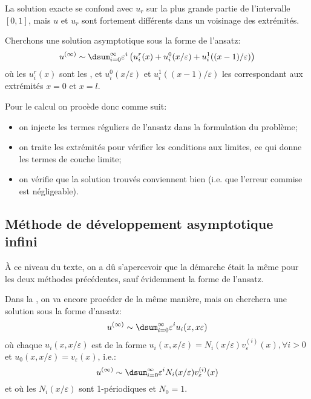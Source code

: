 La solution exacte se confond avec $u_r$ sur la plus grande partie de l'intervalle $[0,1]$,
mais $u$ et $u_r$ sont fortement différents dans un voisinage des extrémités.

\medskip
Cherchons une solution asymptotique sous la forme de l'ansatz:
\begin{equation}
u^{(\infty)} \sim \dsum_{i=0}^\infty \varepsilon^i\left( u_i^r(x) + u_i^0(x/\varepsilon)
+u_i^1((x-1)/\varepsilon) \right)
\end{equation}
où les $u_i^r(x)$ sont les , et $u_i^0(x/\varepsilon)$ et
$u_i^1((x-1)/\varepsilon)$ les  correspondant aux
extrémités $x=0$ et $x=l$.

\medskip
Pour le calcul on procède donc comme suit:
\begin{itemize}
   \item on injecte les termes réguliers de l'ansatz dans la formulation du problème;
   \item on traite les extrémités pour vérifier les conditions aux limites, ce qui donne les termes de couche
	limite;
   \item on vérifie que la solution trouvés conviennent bien (i.e. que l'erreur commise est négligeable).
\end{itemize}


\medskip
\subsection{Méthode de développement asymptotique infini}
À ce niveau du texte, on a dû s'apercevoir que la démarche était la même
pour les deux méthodes précédentes, sauf évidemment la forme de l'ansatz.

Dans la , on va encore procéder
de la même manière, mais on cherchera une solution sous la forme d'ansatz:
\begin{equation}
u^{(\infty)} \sim \dsum_{i=0}^\infty \varepsilon^i u_i(x,x\varepsilon)
\end{equation}
où chaque $u_i(x,x/\varepsilon)$ est de la forme $u_i(x,x/\varepsilon)=N_i(x/\varepsilon)v_\varepsilon^{(i)}(x),
\forall i>0$ et $u_0(x,x/\varepsilon)=v_\varepsilon(x)$, i.e.:
\begin{equation}
u^{(\infty)} \sim \dsum_{i=0}^\infty \varepsilon^i N_i(x/\varepsilon)v_\varepsilon^{(i)}(x)
\end{equation}
et où les $N_i(x/\varepsilon)$ sont 1-périodiques et $N_0=1$.

